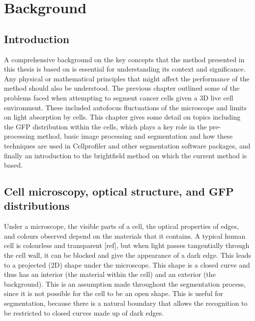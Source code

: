 
\chapter{Background}

\ifpdf
    \graphicspath{{Chapter3/Figs/Raster/}{Chapter3/Figs/PDF/}{Chapter3/Figs/}}
\else
    \graphicspath{{Chapter3/Figs/Vector/}{Chapter3/Figs/}}
\fi

\section{Introduction}

A comprehensive background on the key concepts that the method presented in this thesis is based on is essential for understanding its context and significance. Any physical or mathematical principles that might affect the performance of the method should also be understood. The previous chapter outlined some of the problems faced when attempting to segment cancer cells given a 3D live cell environment. These included autofocus fluctuations of the microscope and limits on light absorption by cells. This chapter gives some detail on topics including the GFP distribution within the cells, which plays a key role in the pre-processing method, basic image processing and segmentation and how these techniques are used in Cellprofiler and other segmentation software packages, and finally an introduction to the brightfield method on which the current method is based.

\section{Cell microscopy, optical structure, and GFP distributions}

Under a microscope, the visible parts of a cell, the optical properties of edges, and colours observed depend on the materials that it contains. A typical human cell is colourless and transparent [ref], but when light passes tangentially through the cell wall, it can be blocked and give the appearance of a dark edge. This leads to a projected (2D) shape under the microscope. This shape is a closed curve and thus has an interior (the material within the cell) and an exterior (the background). This is an assumption made throughout the segmentation process, since it is not possible for the cell to be an open shape. This is useful for segmentation, because there is a natural boundary that allows the recognition to be restricted to closed curves made up of dark edges.

